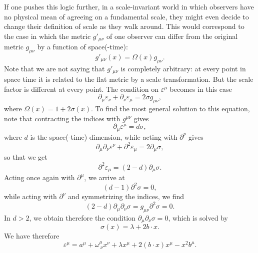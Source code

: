 \documentclass[a4paper,12pt]{article}
\numberwithin{equation}{section}
\begin{document}
If one pushes this logic further, in a scale-invariant world in which observers have no physical mean of agreeing on a fundamental scale, they might even decide to change their definition of scale as they walk around. This would correspond to the case in which the metric $g'_{\mu\nu}$ of one observer can differ from the original metric $g_{\mu\nu}$ by a function of space(-time):
\begin{equation}
	g'_{\mu\nu}(x) = \Omega(x) g_{\mu\nu}.
\end{equation}
Note that we are not saying that $g'_{\mu\nu}$ is completely arbitrary: at every point in space time it is related to the flat metric by a scale transformation. But the scale factor is different at every point.
The condition on $\varepsilon^\mu$ becomes in this case
\begin{equation}
	\partial_\mu \varepsilon_\nu
	+ \partial_\nu \varepsilon_\mu = 2 \sigma g_{\mu\nu},
	\label{eq:conformalkillingeq}
\end{equation}
where $\Omega(x) = 1 + 2\sigma(x)$. To find the most general solution to this equation, note that contracting the indices with $g^{\mu\nu}$ gives
\begin{equation}
	\partial_\mu \varepsilon^\mu  = d \sigma,
\end{equation}
where $d$ is the space(-time) dimension,
while acting with $\partial^\nu$ gives
\begin{equation}
	\partial_\mu \partial_\nu \varepsilon^\nu
	+ \partial^2 \varepsilon_\mu
	= 2 \partial_\mu\sigma,
\end{equation}
so that we get
\begin{equation}
	\partial^2 \varepsilon_\mu
	= (2 - d) \partial_\mu\sigma.
\end{equation}
Acting once again with $\partial^\mu$, we arrive at 
\begin{equation}
	(d - 1) \partial^2 \sigma = 0,
\end{equation}
while acting with $\partial^\nu$ and symmetrizing the indices, we find
\begin{equation}
	(2 - d) \partial_\mu\partial_\nu \sigma
	= g_{\mu\nu} \partial^2 \sigma
	= 0.
\end{equation}
In $d > 2$, we obtain therefore the condition $\partial_\mu \partial_\nu \sigma = 0$, which is solved by 
\begin{equation}
	\sigma(x) = \lambda + 2 b \cdot x.
\end{equation}
We have therefore
\begin{equation}
	\varepsilon^\mu = a^\mu + \omega^\mu_{~\nu} x^\nu
	+ \lambda x^\mu
	+ 2 (b \cdot x) x^\mu - x^2 b^\mu.
	\label{eq:conformalkillingvec}
\end{equation}
\end{document}
